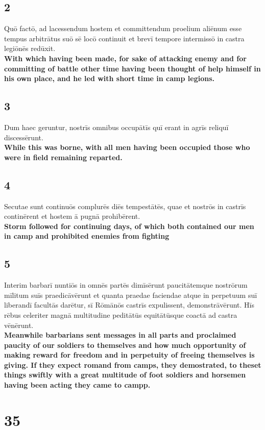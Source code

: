 \documentclass{article}
\begin{document}
\subsection*{2}
Quō factō, ad lacessendum hostem et committendum proelium aliēnum esse tempus arbitrātus suō sē locō continuit et brevī tempore intermissō in castra legiōnēs redūxit. \\
\textbf{With which having been made, for sake of attacking enemy and for committing of battle other time having been thought of help himself in his own place, and he led with short time in camp legions.}

\subsection*{3}
Dum haec geruntur, nostrīs omnibus occupātīs quī erant in agrīs reliquī discessērunt. \\
\textbf{While this was borne, with all men having been occupied those who were in field remaining reparted.}

\subsection*{4}
Secutae sunt continuōs complurēs diēs tempestātēs, quae et nostrōs in castrīs continērent et hostem ā pugnā prohibērent.\\
\textbf{Storm followed for continuing days, of which both contained our men in camp and prohibited enemies from fighting}

\subsection*{5}
Interim barbarī nuntiōs in omnēs partēs dimīsērunt paucitātemque nostrōrum mīlitum suīs praedicāvērunt et quanta praedae faciendae atque in perpetuum suī liberandī facultās darētur, sī Rōmānōs castrīs expulissent, demonstrāvērunt. Hīs rēbus celeriter magnā multitudine peditātūs equitātūsque coactā ad castra vēnērunt.\\
\textbf{Meanwhile barbarians sent messages in all parts and proclaimed paucity of our soldiers to themselves and how much opportunity of making reward for freedom and in perpetuity of freeing themselves is giving. If they expect romand from camps, they demostrated, to theset things swiftly with a great multitude of foot soldiers and horsemen having been acting they came to campp. }

\section*{35}
\end{document}
